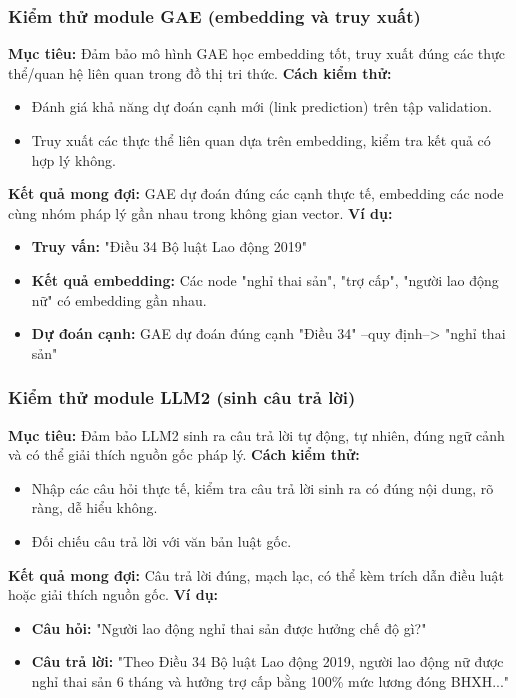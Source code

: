 \documentclass[a4paper]{article}
\begin{document}
\subsubsection{Kiểm thử module GAE (embedding và truy xuất)}
\textbf{Mục tiêu:} Đảm bảo mô hình GAE học embedding tốt, truy xuất đúng các thực thể/quan hệ liên quan trong đồ thị tri thức.
\textbf{Cách kiểm thử:}
\begin{itemize}
\item Đánh giá khả năng dự đoán cạnh mới (link prediction) trên tập validation.
\item Truy xuất các thực thể liên quan dựa trên embedding, kiểm tra kết quả có hợp lý không.
\end{itemize}
\textbf{Kết quả mong đợi:} GAE dự đoán đúng các cạnh thực tế, embedding các node cùng nhóm pháp lý gần nhau trong không gian vector.
\textbf{Ví dụ:}
\begin{itemize}
\item \textbf{Truy vấn:} "Điều 34 Bộ luật Lao động 2019"
\item \textbf{Kết quả embedding:} Các node "nghỉ thai sản", "trợ cấp", "người lao động nữ" có embedding gần nhau.
\item \textbf{Dự đoán cạnh:} GAE dự đoán đúng cạnh "Điều 34" --quy định--> "nghỉ thai sản"
\end{itemize}
\subsubsection{Kiểm thử module LLM2 (sinh câu trả lời)}
\textbf{Mục tiêu:} Đảm bảo LLM2 sinh ra câu trả lời tự động, tự nhiên, đúng ngữ cảnh và có thể giải thích nguồn gốc pháp lý.
\textbf{Cách kiểm thử:}
\begin{itemize}
\item Nhập các câu hỏi thực tế, kiểm tra câu trả lời sinh ra có đúng nội dung, rõ ràng, dễ hiểu không.
\item Đối chiếu câu trả lời với văn bản luật gốc.
\end{itemize}
\textbf{Kết quả mong đợi:} Câu trả lời đúng, mạch lạc, có thể kèm trích dẫn điều luật hoặc giải thích nguồn gốc.
\textbf{Ví dụ:}
\begin{itemize}
\item \textbf{Câu hỏi:} "Người lao động nghỉ thai sản được hưởng chế độ gì?"
\item \textbf{Câu trả lời:} "Theo Điều 34 Bộ luật Lao động 2019, người lao động nữ được nghỉ thai sản 6 tháng và hưởng trợ cấp bằng 100\% mức lương đóng BHXH..."
\end{itemize}
\end{document}
